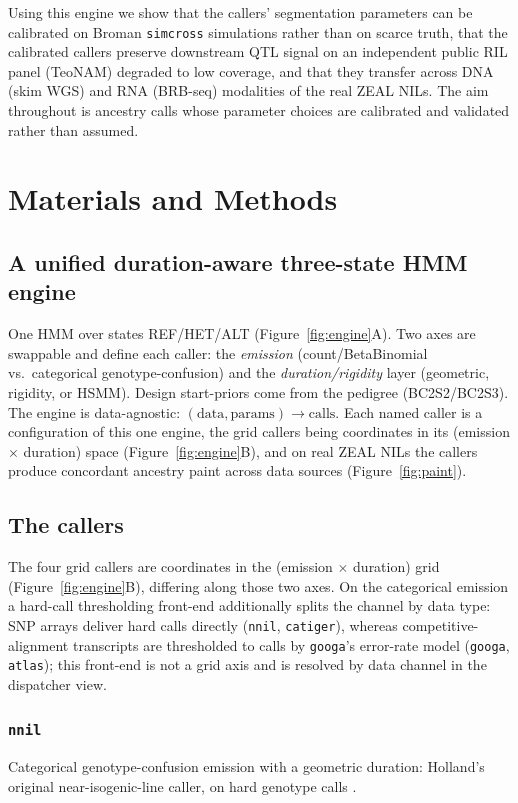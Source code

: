 \documentclass[9pt,twocolumn,twoside]{rilabRxiv}
\newcommand{\nnil}{\texttt{nnil}\xspace}
\newcommand{\catiger}{\texttt{catiger}\xspace}
\newcommand{\googa}{\texttt{googa}\xspace}
\newcommand{\atlas}{\texttt{atlas}\xspace}
\begin{document}
Using this engine we show that the callers' segmentation parameters can be calibrated on
Broman \texttt{simcross} simulations rather than on scarce truth, that the calibrated
callers preserve downstream QTL signal on an independent public RIL panel (TeoNAM)
degraded to low coverage, and that they transfer across DNA (skim WGS) and RNA (BRB-seq)
modalities of the real ZEAL NILs. The aim throughout is ancestry calls whose parameter
choices are calibrated and validated rather than assumed.

\section{Materials and Methods}
\label{sec:materials:methods}

\subsection{A unified duration-aware three-state HMM engine}
One HMM over states REF/HET/ALT (Figure~\ref{fig:engine}A). Two axes are swappable
and define each caller: the \emph{emission} (count/BetaBinomial vs.\ categorical
genotype-confusion) and the \emph{duration/rigidity} layer (geometric, rigidity, or
HSMM). Design start-priors come from the pedigree (BC2S2/BC2S3). The engine is
data-agnostic: $(\text{data}, \text{params}) \rightarrow \text{calls}$. Each named
caller is a configuration of this one engine, the grid callers being coordinates in
its (emission $\times$ duration) space (Figure~\ref{fig:engine}B), and on real ZEAL NILs
the callers produce concordant ancestry paint across data sources (Figure~\ref{fig:paint}).



\subsection{The callers}
The four grid callers are coordinates in the (emission $\times$ duration) grid
(Figure~\ref{fig:engine}B), differing along those two axes. On the categorical
emission a hard-call thresholding front-end additionally splits the channel by data
type: SNP arrays deliver hard calls directly (\nnil, \catiger), whereas
competitive-alignment transcripts are thresholded to calls by \googa's error-rate model
(\googa, \atlas); this front-end is not a grid axis and is resolved by data channel in the
dispatcher view.
\subsubsection{\nnil} Categorical genotype-confusion emission with a geometric
duration: Holland's original near-isogenic-line caller, on hard genotype calls
\citep{zhong2025}.
\end{document}
